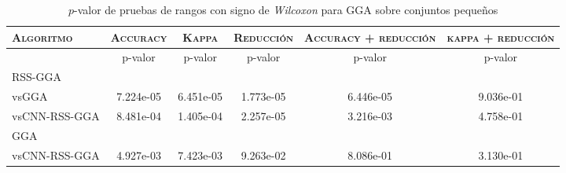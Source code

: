 \begin{table}[h!]
\centering
\begin{adjustbox}{max width =\textwidth}
\begin{tabular}{l c c c c c}
\hline
	\textsc{Algoritmo}
	& \multicolumn{1}{c}{\textsc{Accuracy}}
	& \multicolumn{1}{c}{\textsc{Kappa}}
	& \multicolumn{1}{c}{\textsc{Reducción}} 
	& \multicolumn{1}{c}{\textsc{Accuracy + reducción}} 
	& \multicolumn{1}{c}{\textsc{kappa + reducción}} \\
\hline
\hline

 & p-valor & p-valor & p-valor & p-valor & p-valor \\

RSS-GGA\\
vsGGA & 7.224e-05 & 6.451e-05 & 1.773e-05 & 6.446e-05 & 9.036e-01 \\ 
vsCNN-RSS-GGA & 8.481e-04 & 1.405e-04 & 2.257e-05 & 3.216e-03 & 4.758e-01 \\ 

\hline 

GGA\\
vsCNN-RSS-GGA & 4.927e-03 & 7.423e-03 & 9.263e-02 & 8.086e-01 & 3.130e-01 \\ 

\hline

\end{tabular}
\end{adjustbox}
\caption[Pruebas de \emph{Wilcoxon} entre GGA y variaciones para conjuntos pequeños]{$p$-valor de pruebas de rangos con signo de \emph{Wilcoxon} para GGA sobre conjuntos pequeños}
\label{wilcox-gga-peq}
\end{table}

